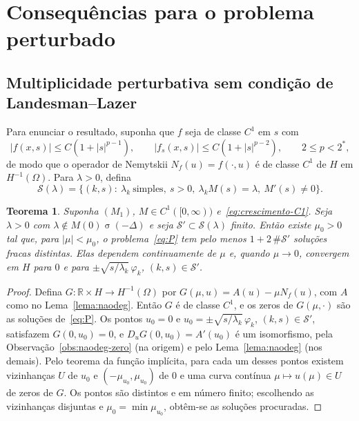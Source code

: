 \documentclass[11pt,a4paper]{article}
\theoremstyle{plain}
\newtheorem{teorema}{Teorema}[section]
\theoremstyle{definition}
\theoremstyle{remark}
\newcommand{\R}{\mathbb{R}}
\newcommand{\Hm}{H^{-1}(\Omega)}
\newcommand{\abs}[1]{\lvert #1\rvert}
\DeclareMathOperator{\spec}{\sigma}
\begin{document}
\section{Consequências para o problema perturbado}\label{sec:consequencias}

\subsection{Multiplicidade perturbativa sem condição de Landesman--Lazer}

Para enunciar o resultado, suponha que $f$ seja de classe $C^1$ em $s$ com
\begin{equation}\label{eq:crescimento-C1}
\abs{f(x,s)}\le C(1+\abs{s}^{p-1}),\qquad \abs{f_s(x,s)}\le C(1+\abs{s}^{p-2}),
\qquad 2\le p<2^* ,
\end{equation}
de modo que o operador de Nemytskii $N_f(u)=f(\cdot,u)$ é de classe $C^1$ de
$H$ em $\Hm$. Para $\lambda>0$, defina
\[
\mathcal{S}(\lambda)=\bigl\{(k,s):\ \lambda_k\ \text{simples},\ s>0,\
\lambda_kM(s)=\lambda,\ M'(s)\ne0\bigr\}.
\]

\begin{teorema}\label{teo:multiplicidade}
Suponha $(M_1)$, $M\in C^1([0,\infty))$ e~\eqref{eq:crescimento-C1}. Seja
$\lambda>0$ com $\lambda\notin M(0)\spec(-\Delta)$ e seja
$\mathcal{S}'\subset\mathcal{S}(\lambda)$ finito. Então existe $\mu_0>0$ tal
que, para $\abs{\mu}<\mu_0$, o problema~\eqref{eq:P} tem pelo menos
$1+2\,\#\mathcal{S}'$ soluções fracas distintas. Elas dependem continuamente de
$\mu$ e, quando $\mu\to0$, convergem em $H$ para $0$ e para
$\pm\sqrt{s/\lambda_k}\,\varphi_k$, $(k,s)\in\mathcal{S}'$.
\end{teorema}

\begin{proof}
Defina $G\colon\R\times H\to\Hm$ por $G(\mu,u)=A(u)-\mu N_f(u)$, com $A$ como no
Lema~\ref{lema:naodeg}. Então $G$ é de classe $C^1$, e os zeros de
$G(\mu,\cdot)$ são as soluções de~\eqref{eq:P}. Os pontos $u_0=0$ e
$u_0=\pm\sqrt{s/\lambda_k}\,\varphi_k$, $(k,s)\in\mathcal{S}'$, satisfazem
$G(0,u_0)=0$, e $D_uG(0,u_0)=A'(u_0)$ é um isomorfismo, pela
Observação~\ref{obs:naodeg-zero} (na origem) e pelo Lema~\ref{lema:naodeg} (nos
demais). Pelo teorema da função implícita, para cada um desses pontos existem
vizinhanças $U$ de $u_0$ e $(-\mu_{u_0},\mu_{u_0})$ de $0$ e uma curva contínua
$\mu\mapsto u(\mu)\in U$ de zeros de $G$. Os pontos são distintos e em número
finito; escolhendo as vizinhanças disjuntas e $\mu_0=\min\mu_{u_0}$, obtêm-se as
soluções procuradas.
\end{proof}
\end{document}

